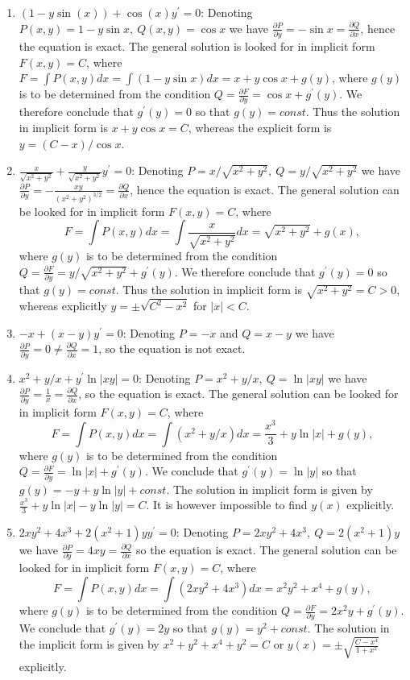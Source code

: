 \documentclass[11pt,a4paper]{article}
\begin{document}
	\begin{enumerate}[\bfseries 1)]
		\item $(1-y\sin(x))+\cos(x)y^\prime = 0$: Denoting $P(x,y) = 1-y\sin x,\ Q(x,y) = \cos x$ we have $\frac{\partial P}{\partial y} = -\sin x = \frac{\partial Q}{\partial x}$, hence the equation is exact. The general solution is looked for in implicit form $F(x, y) = C$, where $F = \int P(x,y)dx = \int (1-y\sin x)dx = x + y\cos x +g(y)$, where $g(y)$ is to be determined from the condition $Q = \frac{\partial F}{\partial y} = \cos x + g^\prime (y)$. We therefore conclude that $g^\prime(y) = 0$ so that $g(y) = const$. Thus the solution in implicit form is $x + y \cos x = C$, whereas the explicit form is $y = (C-x)/\cos x$.
		\item $\frac{x}{\sqrt{x^2+y^2}}+\frac{y}{\sqrt{x^2+y^2}}y^\prime = 0$: Denoting $P=x/\sqrt{x^2+y^2},\ Q = y/\sqrt{x^2+y^2}$ we have $\frac{\partial P}{\partial y} = -\frac{xy}{(x^2+y^2)^{3/2}} = \frac{\partial Q}{\partial x}$, hence the equation is exact. The general solution can be looked for in implicit form $F(x, y) = C$, where
		$$
		F =
		\int P(x,y)dx
		=\int \frac{x}{\sqrt{x^2+y^2}}dx
		=\sqrt{x^2+y^2}+g(x),
		$$
		where $g(y)$ is to be determined from the condition $Q=\frac{\partial F}{\partial y}=y/\sqrt{x^2+y^2}+g^\prime (y)$. We therefore conclude that $g^\prime (y) = 0$ so that $g(y) = const$. Thus the solution in implicit form is $\sqrt{x^2+y^2}=C>0$, whereas explicitly $y=\pm \sqrt{C^2-x^2}$ for $|x|<C$.
		\item $-x + (x-y)y^\prime = 0$: Denoting $P = -x$ and $Q = x-y$ we have $\frac{\partial P}{\partial y}=0 \neq \frac{\partial Q}{\partial x} = 1$,  so the equation is not exact.
		\item $x^2 + y/x + y^\prime \ln |xy| = 0$: Denoting $P = x^2+y/x,\ Q=\ln |xy|$ we have $\frac{\partial P}{\partial y} = \frac{1}{x} = \frac{\partial Q}{\partial x}$, so the equation is exact. The general solution can be looked for in implicit form $F(x, y) = C$, where
		$$
		F
		= \int P(x,y)dx
		= \int (x^2+y/x)dx
		= \frac{x^3}{3} + y\ln |x| + g(y),
		$$
		where $g(y)$ is to be determined from the condition $Q=\frac{\partial F}{\partial y} = \ln |x| + g^\prime(y)$. We conclude that $g^\prime (y) = \ln |y|$ so that $g(y) = -y + y\ln |y| + const$. The solution in implicit form is given by $\frac{x^3}{3}+y\ln |x|-y\ln |y| = C$. It is however impossible to find $y(x)$ explicitly.
		\item $2xy^2+4x^3+2(x^2+1)yy^\prime=0$: Denoting $P=2xy^2+4x^3,\ Q = 2(x^2+1)y$ we have $\frac{\partial P}{\partial y}=4xy=\frac{\partial Q}{\partial x}$ so the equation is exact. The general solution can be looked for in implicit form $F(x, y) = C$, where
		$$
		F
		= \int P(x,y)dx
		= \int (2xy^2+4x^3)dx
		= x^2y^2+x^4+g(y),
		$$
		where $g(y)$ is to be determined from the condition $Q=\frac{\partial F}{\partial y} = 2x^2y+g^\prime (y)$. We conclude that $g^\prime(y)=2y$ so that $g(y) = y^2+const$. The solution in the implicit form is given by $x^2+y^2+x^4+y^2=C$ or $y(x)=\pm \sqrt{\frac{C-x^4}{1+x^2}}$ explicitly.
	\end{enumerate}
\end{document}

